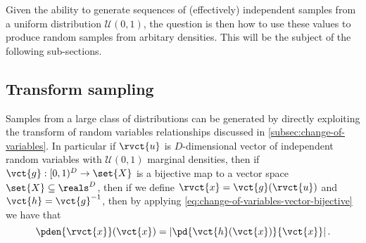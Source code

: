 Given the ability to generate sequences of (effectively) independent samples from a uniform distribution $\mathcal{U}(0,1)$, the question is then how to use these values to produce random samples from arbitary densities. This will be the subject of the following sub-sections.

\subsection{Transform sampling}

Samples from a large class of distributions can be generated by directly exploiting the transform of random variables relationships discussed in \ref{subsec:change-of-variables}. In particular if $\rvct{u}$ is $D$-dimensional vector of independent random variables with $\mathcal{U}(0,1)$ marginal densities, then if $\vct{g} :  [0,1)^D \to \set{X}$ is a bijective map to a vector space $\set{X} \subseteq \reals^D$, then if we define $\rvct{x} = \vct{g}(\rvct{u})$ and $\vct{h} = \vct{g}^{-1}$, then by applying \eqref{eq:change-of-variables-vector-bijective} we have that
\begin{equation}\label{eq:transform-sampling-uniform}
  \pden{\rvct{x}}(\vct{x}) = \left|\pd{\vct{h}(\vct{x})}{\vct{x}}\right|.
\end{equation}
